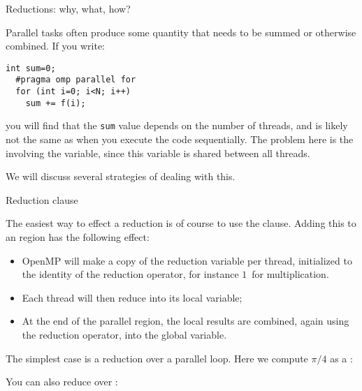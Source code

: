 
\label{sec:reduction}

 {Reductions: why, what, how?}
\label{sec:reduct-intro}

Parallel tasks often produce some quantity that needs to be summed
or otherwise combined.
If you write:
\begin{lstlisting}[language=omp]
  int sum=0;
  #pragma omp parallel for
  for (int i=0; i<N; i++)
    sum += f(i);
\end{lstlisting}
you will find that the \lstinline{sum} value depends on the number of threads,
and is likely not the same as when you execute the code sequentially.
The problem here is the  involving the 
variable, since this variable is shared between all threads.

We will discuss several strategies of dealing with this.

 {Reduction clause}

The easiest way to effect a reduction is of course to use the 
clause.
Adding this to an  region
has the following effect:
\begin{itemize}
\item OpenMP will make a copy of the reduction variable per thread,
  initialized to the identity of the reduction operator, for instance
  $1$~for multiplication.
\item Each thread will then reduce into its local variable;
\item At the end of the parallel region, the local results are combined, again
  using the reduction operator, into the global variable.
\end{itemize}

The simplest case is a reduction over a parallel loop.
Here we compute $\pi/4$ as a :


You can also reduce over :
%

